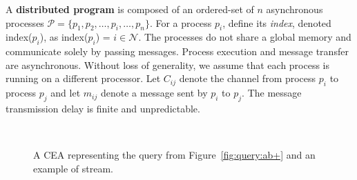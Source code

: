 A \textbf{distributed program} is composed of an ordered-set of $n$ asynchronous processes $\mathcal{P} = \{ p_{1}, p_{2}, \ldots, p_{i}, \ldots, p_{n}\}$. For a process $p_{i}$, define its \emph{index}, denoted index($p_{i}$), as index($p_{i}$) = $i \in \mathcal{N}$. The processes do not share a global memory and communicate solely by passing messages. Process execution and message transfer are asynchronous. Without loss of generality, we assume that each process is running on a different processor. Let $C_{ij}$ denote the channel from process $p_{i}$ to process $p_{j}$ and let $m_{ij}$ denote a message sent by $p_{i}$ to $p_{j}$. The message transmission delay is finite and unpredictable.



\begin{figure}[H]
  \centering
  \begin{subfigure}[b]{\textwidth}
    \centering
  \end{subfigure}
  \\
  \begin{subfigure}[t]{\textwidth}
    \centering
  \end{subfigure}

  \caption{A CEA representing the query from Figure~\ref{fig:query:ab+} and an example of stream.}
  \label{fig:cea:ab+}
\end{figure}
